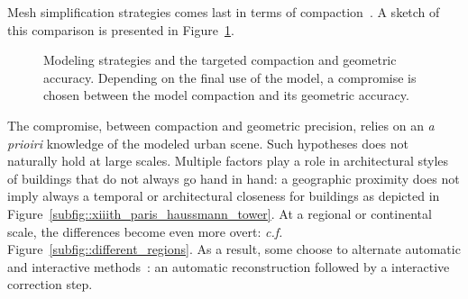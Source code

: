             Mesh simplification strategies comes last in terms of compaction~\parencite{verdie2015lod, zhou20102}.
            A sketch of this comparison is presented in Figure~\ref{fig::modeling_strategies}.\\
            \begin{figure}[htpb]
                \centering
                            
                \caption{
                    \label{fig::modeling_strategies} Modeling strategies and the targeted compaction and geometric accuracy.
                    Depending on the final use of the model, a compromise is chosen between the model compaction and its geometric accuracy.
                }
            \end{figure}
            The compromise, between compaction and geometric precision, relies on an \textit{a prioiri} knowledge of the modeled urban scene.
            Such hypotheses does not naturally hold at large scales.
            Multiple factors play a role in architectural styles of buildings that do not always go hand in hand:
            a geographic proximity does not imply always a temporal or architectural closeness for buildings as depicted in Figure~\ref{subfig::xiiith_paris_haussmann_tower}.
            At a regional or continental scale, the differences become even more overt: \textit{c.f.} Figure~\ref{subfig::different_regions}.
            As a result, some choose to alternate automatic and interactive methods~\parencite{musialski2013survey}: an automatic reconstruction followed by a interactive correction step.

